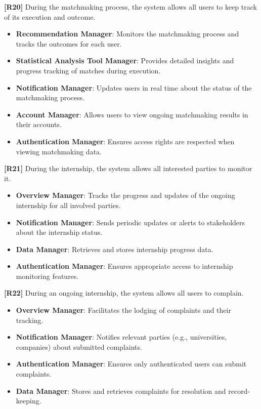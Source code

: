 \textbf{[R20]} During the matchmaking process, the system allows all users to keep track of its execution and outcome.
\begin{itemize}
    \item \textbf{Recommendation Manager}: Monitors the matchmaking process and tracks the outcomes for each user.
    \item \textbf{Statistical Analysis Tool Manager}: Provides detailed insights and progress tracking of matches during execution.
    \item \textbf{Notification Manager}: Updates users in real time about the status of the matchmaking process.
    \item \textbf{Account Manager}: Allows users to view ongoing matchmaking results in their accounts.
    \item \textbf{Authentication Manager}: Ensures access rights are respected when viewing matchmaking data.
\end{itemize}

\textbf{[R21]} During the internship, the system allows all interested parties to monitor it.
\begin{itemize}
    \item \textbf{Overview Manager}: Tracks the progress and updates of the ongoing internship for all involved parties.
    \item \textbf{Notification Manager}: Sends periodic updates or alerts to stakeholders about the internship status.
    \item \textbf{Data Manager}: Retrieves and stores internship progress data.
    \item \textbf{Authentication Manager}: Ensures appropriate access to internship monitoring features.
\end{itemize}

\textbf{[R22]} During an ongoing internship, the system allows all users to complain.
\begin{itemize}
    \item \textbf{Overview Manager}: Facilitates the lodging of complaints and their tracking.
    \item \textbf{Notification Manager}: Notifies relevant parties (e.g., universities, companies) about submitted complaints.
    \item \textbf{Authentication Manager}: Ensures only authenticated users can submit complaints.
    \item \textbf{Data Manager}: Stores and retrieves complaints for resolution and record-keeping.
\end{itemize}

